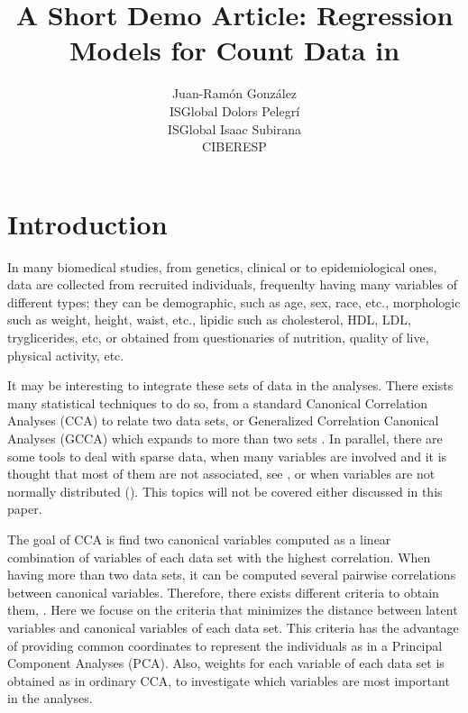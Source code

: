 \documentclass[article]{jss}
\author{Juan-Ramón González\\ISGlobal
   \And Dolors Pelegrí\\ISGlobal
   \And Isaac Subirana\\CIBERESP}
\title{A Short Demo Article: Regression Models for Count Data in \proglang{R}}
\begin{document}


\section{Introduction} \label{sec:intro}

In many biomedical studies, from genetics, clinical or to epidemiological ones, data are collected from recruited individuals, frequenlty having many variables of different types; they can be demographic, such as age, sex, race, etc., morphologic such as weight, height, waist, etc., lipidic such as cholesterol, HDL, LDL, tryglicerides, etc, or obtained from questionaries of nutrition, quality of live, physical activity, etc.

It may be interesting to integrate these sets of data in the analyses. There exists many statistical techniques to do so, from a standard Canonical Correlation Analyses (CCA) to relate two data sets, or Generalized Correlation Canonical Analyses (GCCA) which expands to more than two sets \cite{Tenenhaus:2011}. In parallel, there are some tools to deal with sparse data, when many variables are involved and it is thought that most of them are not associated, see \cite{Tenenhaus:2017}, or when variables are not normally distributed (\cite{MOFA}). This topics will not be covered either discussed in this paper.

The goal of CCA is find two canonical variables computed as a linear combination of variables of each data set with the highest correlation.
When having more than two data sets, it can be computed several pairwise correlations between canonical variables. Therefore, there exists different criteria to obtain them, \cite{Tenenhaus:2017}.
Here we focuse on the criteria that minimizes the distance between latent variables and canonical variables of each data set. This criteria has the advantage of providing common coordinates to represent the individuals as in a Principal Component Analyses (PCA). Also, weights for each variable of each data set is obtained as in ordinary CCA, to investigate which variables are most important in the analyses.
\end{document}
